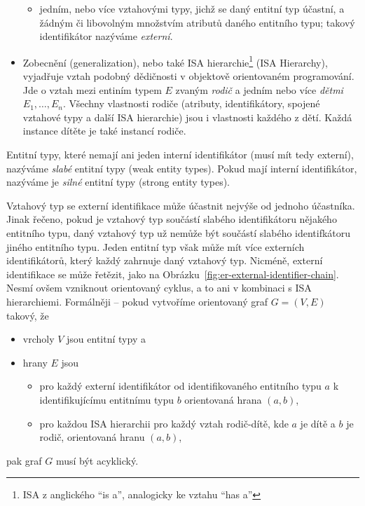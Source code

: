 \begin{itemize}
\begin{itemize}
          \item jedním, nebo více vztahovými typy, jichž se daný entitní typ účastní, a žádným či libovolným množstvím atributů daného entitního typu; takový identifikátor nazýváme \emph{externí}.
        \end{itemize}
  \item Zobecnění (generalization), nebo také ISA hierarchie\footnote{ISA z anglického \enquote{is a}, analogicky ke vztahu \enquote{has a}} (ISA Hierarchy), vyjadřuje vztah podobný dědičnosti v objektově orientovaném programování.
        Jde o vztah mezi entiním typem $E$ zvaným \emph{rodič} a jedním nebo více \emph{dětmi} $E_1, \dots, E_n$.
        Všechny vlastnosti rodiče (atributy, identifikátory, spojené vztahové typy a další ISA hierarchie) jsou i vlastnosti každého z dětí.
        Každá instance dítěte je také instancí rodiče.
\end{itemize}

Entitní typy, které nemají ani jeden interní identifikátor (musí mít tedy externí), nazýváme \emph{slabé} entitní typy (weak entity types).
Pokud mají interní identifikátor, nazýváme je \emph{silné} entitní typy (strong entity types).

Vztahový typ se externí identifikace může účastnit nejvýše od jednoho účastníka.
Jinak řečeno, pokud je vztahový typ součástí slabého identifikátoru nějakého entitního typu, daný vztahový typ už nemůže být součástí slabého identifkátoru jiného entitního typu.
Jeden entitní typ však může mít více externích identifikátorů, který každý zahrnuje daný vztahový typ.
Nicméně, externí identifikace se může řetězit, jako na Obrázku~\ref{fig:er-external-identifier-chain}.
Nesmí ovšem vzniknout orientovaný cyklus, a to ani v kombinaci s ISA hierarchiemi.
Formálněji -- pokud vytvoříme orientovaný graf $G=(V,E)$ takový, že
\begin{itemize}
  \item vrcholy $V$ jsou entitní typy a
  \item hrany $E$ jsou
        \begin{itemize}
          \item pro každý externí identifikátor od identifikovaného entitního typu $a$ k identifikujícímu entitnímu typu $b$ orientovaná hrana $(a, b)$,
          \item pro každou ISA hierarchii pro každý vztah rodič-dítě, kde $a$ je dítě a $b$ je rodič, orientovaná hranu $(a, b)$,
        \end{itemize}
\end{itemize}
pak graf $G$ musí být acyklický.

